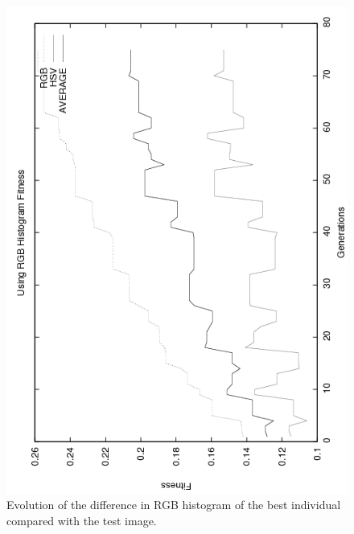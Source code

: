 \begin{figure}
   \includegraphics[angle=-90,scale =0.40] {gfx/art/rgbgens.png}
\caption{Evolution of the difference in RGB histogram of the best individual compared with the test image. }
\label{fig:rgbgens}
\end{figure}

